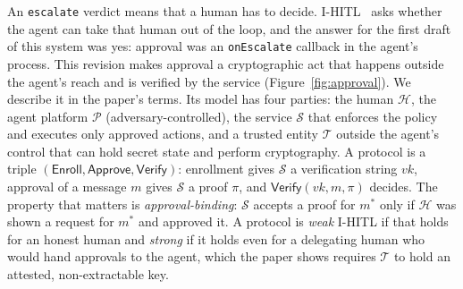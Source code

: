 \documentclass[10pt]{article}
\newcommand{\code}[1]{{\def\_{\char`\_\allowbreak}\texttt{#1}}}
\begin{document}
An \code{escalate} verdict means that a human has to decide. I-HITL~\cite{ihitl} asks whether the agent can take that human out of the loop, and the answer for the first draft of this system was yes: approval was an \code{onEscalate} callback in the agent's process. This revision makes approval a cryptographic act that happens outside the agent's reach and is verified by the service (Figure~\ref{fig:approval}). We describe it in the paper's terms. Its model has four parties: the human $\mathcal{H}$, the agent platform $\mathcal{P}$ (adversary-controlled), the service $\mathcal{S}$ that enforces the policy and executes only approved actions, and a trusted entity $\mathcal{T}$ outside the agent's control that can hold secret state and perform cryptography. A protocol is a triple $(\mathsf{Enroll}, \mathsf{Approve}, \mathsf{Verify})$: enrollment gives $\mathcal{S}$ a verification string $vk$, approval of a message $m$ gives $\mathcal{S}$ a proof $\pi$, and $\mathsf{Verify}(vk, m, \pi)$ decides. The property that matters is \emph{approval-binding}: $\mathcal{S}$ accepts a proof for $m^{*}$ only if $\mathcal{H}$ was shown a request for $m^{*}$ and approved it. A protocol is \emph{weak} I-HITL if that holds for an honest human and \emph{strong} if it holds even for a delegating human who would hand approvals to the agent, which the paper shows requires $\mathcal{T}$ to hold an attested, non-extractable key.
\end{document}
